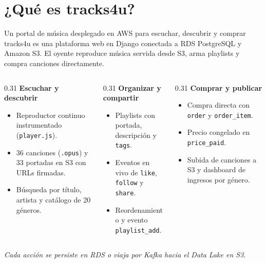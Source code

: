 \documentclass[aspectratio=169,11pt]{beamer}
\begin{document}
\section{¿Qué es tracks4u?}
\begin{frame}{Un portal de música desplegado en AWS para escuchar, descubrir y comprar}
  \small
  \textcolor{muted}{tracks4u es una plataforma web en Django conectada a RDS PostgreSQL y Amazon S3. El oyente reproduce música servida desde S3, arma playlists y compra canciones directamente.}

  \vspace{1em}
  \footnotesize
  \begin{columns}[T,onlytextwidth]
    \begin{column}{0.31\textwidth}
      \textbf{\color{accent}Escuchar y descubrir}
      \begin{itemize}\setlength{\itemsep}{2pt}
        \item Reproductor continuo instrumentado (\texttt{player.js}).
        \item 36 canciones (\texttt{.opus}) y 33 portadas en S3 con URLs firmadas.
        \item Búsqueda por título, artista y catálogo de 20 géneros.
      \end{itemize}
    \end{column}
    \begin{column}{0.31\textwidth}
      \textbf{\color{accent}Organizar y compartir}
      \begin{itemize}\setlength{\itemsep}{2pt}
        \item Playlists con portada, descripción y \texttt{tags}.
        \item Eventos en vivo de \texttt{like}, \texttt{follow} y \texttt{share}.
        \item Reordenamiento y evento \texttt{playlist\_add}.
      \end{itemize}
    \end{column}
    \begin{column}{0.31\textwidth}
      \textbf{\color{accent}Comprar y publicar}
      \begin{itemize}\setlength{\itemsep}{2pt}
        \item Compra directa con \texttt{order} y \texttt{order\_item}.
        \item Precio congelado en \texttt{price\_paid}.
        \item Subida de canciones a S3 y dashboard de ingresos por género.
      \end{itemize}
    \end{column}
  \end{columns}

  \vfill
  \begin{center}\itshape\textcolor{muted}{Cada acción se persiste en RDS o viaja por Kafka hacia el Data Lake en S3.}\end{center}
\end{frame}
\end{document}
